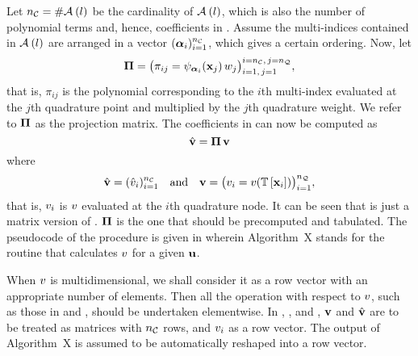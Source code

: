 Let ${n_\mathcal{C}} = \# \mathcal{A}_{}\left( l \right)$ be the cardinality of $\mathcal{A}_{}\left( l \right)$, which is also the number of polynomial terms and, hence, coefficients in .
Assume the multi-indices contained in $\mathcal{A}_{}\left( l \right)$ are arranged in a vector $(\bm{\alpha}_i)_{i = 1}^{n_\mathcal{C}}$, which gives a certain ordering.
Now, let
\begin{equation} \elab{projection-matrix}
  \projection = \big( \pi_{ij} = \polynomial_{\multiindex_i}(\point_j) \, \weight_j \big)_{i = 1, \, j = 1}^{i = \ncorder, \, j = \nqorder},
\end{equation}
that is, $\pi_{ij}$ is the polynomial corresponding to the $i$th multi-index evaluated at the $j$th quadrature point and multiplied by the $j$th quadrature weight.
We refer to $\bm{\Pi}$ as the projection matrix.
The coefficients in  can now be computed as
\begin{equation} \elab{coefficient-evaluation}
  \coefficient{\vw} = \projection \, \vw
\end{equation}
where
\begin{equation} \elab{quantity-evaluation}
  \coefficient{\vw} = (\coefficient{\w}_i)_{i = 1}^\ncorder \hspace{1em} \text{and} \hspace{1em} \vw = \big( \w_i = \w(\transformation{\point_i}) \big)_{i = 1}^\nqorder,
\end{equation}
that is, $v_i$ is $v$ evaluated at the $i$th quadrature node.
It can be seen that  is just a matrix version of .
$\bm{\Pi}$ is the one that should be precomputed and tabulated.
The pseudocode of the procedure is given in  wherein Algorithm~X stands for the routine that calculates $v$ for a given $\mathbf{u}$.


\begin{remark} 
When $v$ is multidimensional, we shall consider it as a row vector with an appropriate number of elements.
Then all the operation with respect to $v$, such as those in  and , should be undertaken elementwise.
In , , and , $\mathbf{v}$ and $\hat{\mathbf{v}}$ are to be treated as matrices with ${n_\mathcal{C}}$ rows, and $v_i$ as a row vector.
The output of Algorithm~X is assumed to be automatically reshaped into a row vector.
\end{remark}
